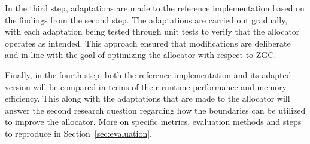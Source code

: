 In the third step, adaptations are made to the reference implementation based on the findings from the second step. The adaptations are carried out gradually, with each adaptation being tested through unit tests to verify that the allocator operates as intended. This approach ensured that modifications are deliberate and in line with the goal of optimizing the allocator with respect to ZGC.

Finally, in the fourth step, both the reference implementation and its adapted version will be compared in terms of their runtime performance and memory efficiency. This along with the adaptations that are made to the allocator will answer the second research question regarding how the boundaries can be utilized to improve the allocator. More on specific metrics, evaluation methods and steps to reproduce in Section~\ref{sec:evaluation}.

